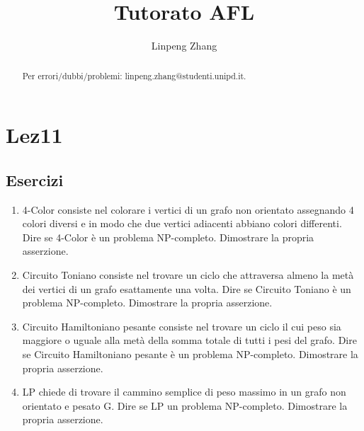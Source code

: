 \documentclass[a4paper,11pt]{article}
\begin{document}
\author{Linpeng Zhang}
\title{Tutorato AFL}
\maketitle
\begin{abstract}
    Per errori/dubbi/problemi: linpeng.zhang@studenti.unipd.it.
\end{abstract}
\tableofcontents
\section{Lez11}
\subsection{Esercizi}
\begin{enumerate}
    \item 4-Color consiste nel colorare i vertici di un grafo non orientato assegnando 4 colori diversi e in modo che due vertici adiacenti abbiano colori differenti. Dire se 4-Color è un problema NP-completo. Dimostrare la propria asserzione.
    \item Circuito Toniano consiste nel trovare un ciclo che attraversa almeno la metà dei vertici di un grafo esattamente una volta. Dire se Circuito Toniano è un problema NP-completo. Dimostrare la propria asserzione.
    \item Circuito Hamiltoniano pesante consiste nel trovare un ciclo il cui peso sia maggiore o uguale alla metà della somma totale di tutti i pesi del grafo. Dire se Circuito Hamiltoniano pesante è un problema NP-completo. Dimostrare la propria asserzione.
    \item LP chiede di trovare il cammino semplice di peso massimo in un grafo non orientato e pesato G. Dire se LP un problema NP-completo. Dimostrare la propria asserzione.

\end{enumerate}
\end{document}
